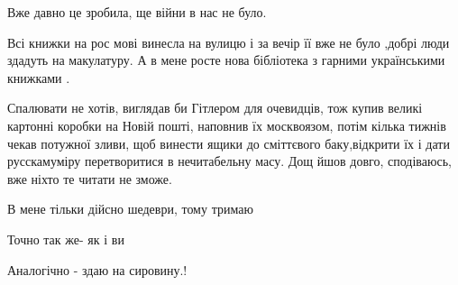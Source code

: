 \begin{itemize}
Вже давно це зробила, ще війни в нас не було.

 

Всі книжки на рос мові винесла на вулицю і за вечір її вже не було ,добрі люди
здадуть на макулатуру. А в мене росте нова бібліотека з гарними українськими
книжками .


Спалювати не хотів, виглядав би Гітлером для очевидців, тож купив великі
картонні коробки на Новій пошті, наповнив їх москвоязом, потім кілька тижнів
чекав потужної зливи, щоб винести ящики до сміттєвого баку,відкрити їх і дати
русскамуміру перетворитися в нечитабельну масу. Дощ йшов довго, сподіваюсь, вже
ніхто те читати не зможе.


 
В мене тільки дійсно шедеври, тому тримаю

 
Точно так же- як і ви

 
Аналогічно - здаю на сировину.!

\end{itemize}

